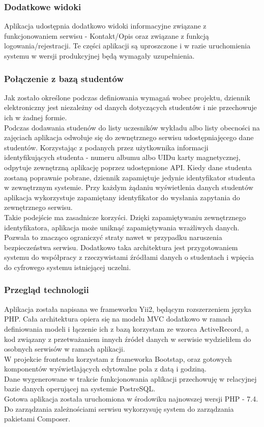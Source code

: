 \documentclass[declaration,shortabstract, mgr]{iithesis}
\begin{document}
\subsubsection{Dodatkowe widoki}
\indent Aplikacja udostępnia dodatkowo widoki informacyjne związane z funkcjonowaniem serwisu - Kontakt/Opis oraz związane z funkcją logowania/rejestracji. Te części aplikacji są uproszczone i w razie uruchomienia systemu w wersji produkcyjnej będą wymagały uzupełnienia.

\subsubsection{Połączenie z bazą studentów}
\indent Jak zostało określone podczas definiowania wymagań wobec projektu, dziennik elektroniczny jest niezależny od danych dotyczących studentów i nie przechowuje ich w żadnej formie.\\
\indent  Podczas dodawania studenów do listy uczesników wykładu albo listy obecności na zajęciach aplikacja odwołuje się do zewnętrznego serwisu udostępniajęcego dane studentów.  Korzystając z podanych przez użytkownika informacji identyfikujących studenta - numeru albumu albo UIDu karty magnetycznej, odpytuje zewnętrzną aplikację poprzez udostępnione API. Kiedy dane studenta zostaną poprawnie pobrane, dziennik zapamiętuje jedynie identyfikator studenta w zewnętrznym systemie. Przy każdym żądaniu wyświetlenia danych studentów aplikacja wykorzystuje zapamiętany identyfikator do wysłania zapytania do zewnętrznego serwisu. \\
\indent Takie podejście ma zasadnicze korzyści. Dzięki zapamiętywaniu zewnętrznego identyfikatora, aplikacja może uniknąć zapamiętywania wrażliwych danych. Pozwala to znacząco ograniczyć straty nawet w przypadku naruszenia bezpieczeństwa serwisu. Dodatkowo taka architektura jest przygotowaniem systemu do współpracy z rzeczywistami źródłami danych o studentach i wpięcia do cyfrowego systemu istniejącej uczelni.\\
\subsubsection{Przegląd technologii}
\indent Aplikacja została napisana we frameworku Yii2\cite{yii}, będącym rozszerzeniem języka PHP. Cała architektura opiera się na modelu MVC dodatkowo w ramach definiowania modeli i łączenie ich z bazą korzystam ze wzorca ActiveRecord, a kod związany z przetważaniem innych źródeł danych w serwisie wydzieliłem do osobnych serwisów w ramach aplikacji.\\
\indent W projekcie frontendu korzystam z frameworka Bootstap\cite{bootstrap}, oraz gotowych komponentów\cite{kartik}\cite{da1}\cite{da2} wyświetlających edytowalne pola z datą i godziną. \\
\indent Dane wygenerowane w trakcie funkcjonowania aplikacji przechowuję w relacyjnej bazie danych operującej na systemie PostreSQL\cite{psql}.\\
\indent Gotowa aplikacja została uruchomiona w środowiku najnowszej wersji PHP - 7.4.\\
\indent Do zarządzania zależnościami serwisu wykorzysuję system do zarządzania pakietami Composer\cite{composer}.
\end{document}
